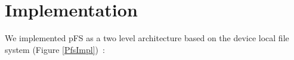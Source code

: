 
\section{Implementation}
\label{sec:impl}

%


We implemented pFS as a two level architecture based on the device
local file system (Figure \ref{PfsImpl})~:

